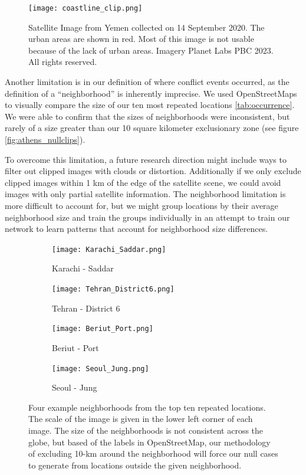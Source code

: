 \begin{figure}
    \centering
    \texttt{[image: coastline\_clip.png]}
    \caption{Satellite Image from Yemen collected on 14 September 2020.  The urban areas are shown in red.  Most of this image is not usable because of the lack of urban areas. Imagery \textcopyright Planet Labs PBC 2023. All rights reserved.}
    \label{fig:coastline_clip}
\end{figure}

Another limitation is in our definition of where conflict events occurred, as the definition of a ``neighborhood'' is inherently imprecise.  We used OpenStreetMaps \citep{OpenStreetMap2024} to visually compare the size of our ten most repeated locations \ref{tab:occurrence}.  We were able to confirm that the sizes of neighborhoods were inconsistent, but rarely of a size greater than our 10 square kilometer exclusionary zone (see figure \ref{fig:athens_nullclips}). 

To overcome this limitation, a future research direction might include ways to filter out clipped images with clouds or distortion.  Additionally if we only exclude clipped images within 1 km of the edge of the satellite scene, we could avoid images with only partial satellite information.  The neighborhood limitation is more difficult to account for, but we might group locations by their average neighborhood size and train the groups individually in an attempt to train our network to learn patterns that account for neighborhood size differences.

\begin{figure}
    \centering
    \begin{subfigure}[b]{0.45\linewidth}
        \texttt{[image: Karachi\_Saddar.png]}
        \caption{Karachi - Saddar }
    \end{subfigure}
    \quad 
    \begin{subfigure}[b]{0.45\linewidth}
        \texttt{[image: Tehran\_District6.png]}
        \caption{Tehran - District 6}
    \end{subfigure}
    \begin{subfigure}[b]{0.45\linewidth}
        \texttt{[image: Beriut\_Port.png]}
        \caption{Beriut - Port}
    \end{subfigure}
    \quad 
    \begin{subfigure}[b]{0.45\linewidth}
        \texttt{[image: Seoul\_Jung.png]}
        \caption{Seoul - Jung}
    \end{subfigure}
    \caption{Four example neighborhoods from the top ten repeated locations.  The scale of the image is given in the lower left corner of each image. 
 The size of the neighborhoods is not consistent across the globe, but based of the labels in OpenStreetMap\citep{OpenStreetMap2024}, our methodology of excluding 10-km around the neighborhood will force our null cases to generate from locations outside the given neighborhood.}
 \label{fig:neighborhoods}
\end{figure}

